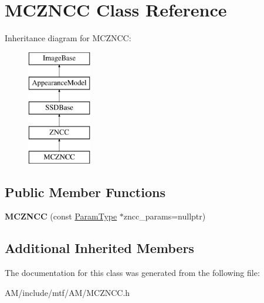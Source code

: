 \hypertarget{classMCZNCC}{\section{M\-C\-Z\-N\-C\-C Class Reference}
\label{classMCZNCC}
}
Inheritance diagram for M\-C\-Z\-N\-C\-C\-:\begin{figure}[H]
\begin{center}
\leavevmode
\includegraphics[height=5.000000cm]{classMCZNCC}
\end{center}
\end{figure}
\subsection*{Public Member Functions}
\begin{DoxyCompactItemize}
\item 
\hypertarget{classMCZNCC_af896e0fd0955d6a36f44dadd890a337e}{{\bfseries M\-C\-Z\-N\-C\-C} (const \hyperlink{structZNCCParams}{Param\-Type} $\ast$zncc\-\_\-params=nullptr)}\label{classMCZNCC_af896e0fd0955d6a36f44dadd890a337e}

\end{DoxyCompactItemize}
\subsection*{Additional Inherited Members}


The documentation for this class was generated from the following file\-:\begin{DoxyCompactItemize}
\item 
A\-M/include/mtf/\-A\-M/M\-C\-Z\-N\-C\-C.\-h\end{DoxyCompactItemize}
